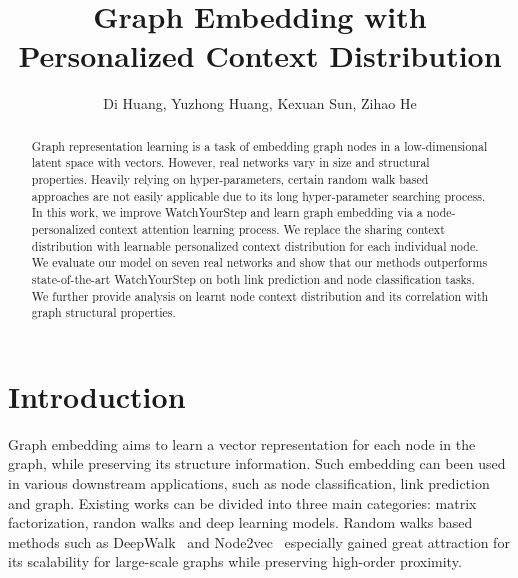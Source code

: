 \documentclass{article}
\title{Graph Embedding with Personalized Context Distribution}
\author{
Di Huang, Yuzhong Huang, Kexuan Sun, Zihao He}
\begin{document}
\maketitle

\begin{abstract}
Graph representation learning is a task of embedding graph nodes in a low-dimensional latent space with vectors. 
However, real networks vary in size and structural properties. Heavily relying on hyper-parameters, certain random walk based approaches are not easily applicable due to its long hyper-parameter searching process. In this work, we improve WatchYourStep and learn graph embedding via a node-personalized context attention learning process. We replace the sharing context distribution with learnable personalized context distribution for each individual node. We evaluate our model on seven real networks and show that our methods outperforms state-of-the-art WatchYourStep on both link prediction and node classification tasks. We further provide analysis on learnt node context distribution and its correlation with graph structural properties.
\end{abstract}

\section{Introduction}

Graph embedding aims to learn a vector representation for each node in the graph, while preserving its structure information. Such embedding can been used in various downstream applications, such as node classification, link prediction and graph. Existing works can be divided into three main categories: matrix factorization, randon walks and deep learning models. Random walks based methods such as DeepWalk~\cite{perozzi2014deepwalk} and Node2vec~\cite{grover2016node2vec} especially gained great attraction for its scalability for large-scale graphs while preserving high-order proximity.

\end{document}
